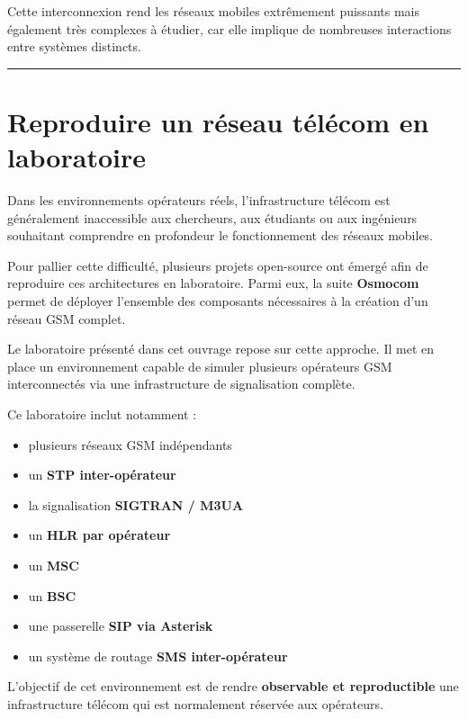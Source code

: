 \documentclass[
]{article}
\providecommand{\tightlist}{%
  \setlength{\itemsep}{0pt}\setlength{\parskip}{0pt}}
\begin{document}
Cette interconnexion rend les réseaux mobiles extrêmement puissants mais
également très complexes à étudier, car elle implique de nombreuses
interactions entre systèmes distincts.

\begin{center}\rule{0.5\linewidth}{0.5pt}\end{center}

\section{Reproduire un réseau télécom en
laboratoire}\label{reproduire-un-ruxe9seau-tuxe9luxe9com-en-laboratoire}

Dans les environnements opérateurs réels, l'infrastructure télécom est
généralement inaccessible aux chercheurs, aux étudiants ou aux
ingénieurs souhaitant comprendre en profondeur le fonctionnement des
réseaux mobiles.

Pour pallier cette difficulté, plusieurs projets open-source ont émergé
afin de reproduire ces architectures en laboratoire. Parmi eux, la suite
\textbf{Osmocom} permet de déployer l'ensemble des composants
nécessaires à la création d'un réseau GSM complet.

Le laboratoire présenté dans cet ouvrage repose sur cette approche. Il
met en place un environnement capable de simuler plusieurs opérateurs
GSM interconnectés via une infrastructure de signalisation complète.

Ce laboratoire inclut notamment :

\begin{itemize}
\tightlist
\item
  plusieurs réseaux GSM indépendants
\item
  un \textbf{STP inter-opérateur}
\item
  la signalisation \textbf{SIGTRAN / M3UA}
\item
  un \textbf{HLR par opérateur}
\item
  un \textbf{MSC}
\item
  un \textbf{BSC}
\item
  une passerelle \textbf{SIP via Asterisk}
\item
  un système de routage \textbf{SMS inter-opérateur}
\end{itemize}

L'objectif de cet environnement est de rendre \textbf{observable et
reproductible} une infrastructure télécom qui est normalement réservée
aux opérateurs.
\end{document}
